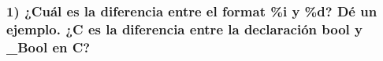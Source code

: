 \subsubsection*{1) ¿Cuál es la diferencia entre el format \%i y \%d? Dé un ejemplo. ¿C es la diferencia entre la declaración bool y \_Bool en C?}

